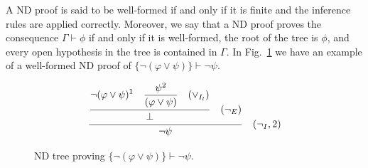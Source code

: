 A ND proof is said to be well-formed if and only if it is finite and the inference rules are applied correctly. Moreover, we say that a ND proof proves the consequence \(\Gamma \vdash \phi\) if and only if it is well-formed, the root of the tree is \(\phi\), and every open hypothesis in the tree is contained in \(\Gamma\).
In Fig.~\ref{tab:proof-tree} we have an example of a well-formed ND proof of \( \{\neg (\varphi \lor \psi)\} \vdash \neg \psi \).

\begin{figure}[h]
    \centering
    \[
    \frac{\displaystyle \frac{
    \displaystyle \neg (\varphi \lor \psi)^1 \quad \displaystyle \frac{\psi^2}{(\varphi \lor \psi) \strut} \quad (\lor_{I_l}) \strut}
    {\displaystyle \bot \strut} \quad (\displaystyle \neg_E)\strut} {\displaystyle \neg \psi \strut} \quad (\neg_I, 2)
    \]
    \caption{ND tree proving \( \{\neg (\varphi \lor \psi)\} \vdash \neg \psi \).}
    \label{tab:proof-tree}
\end{figure}
%
